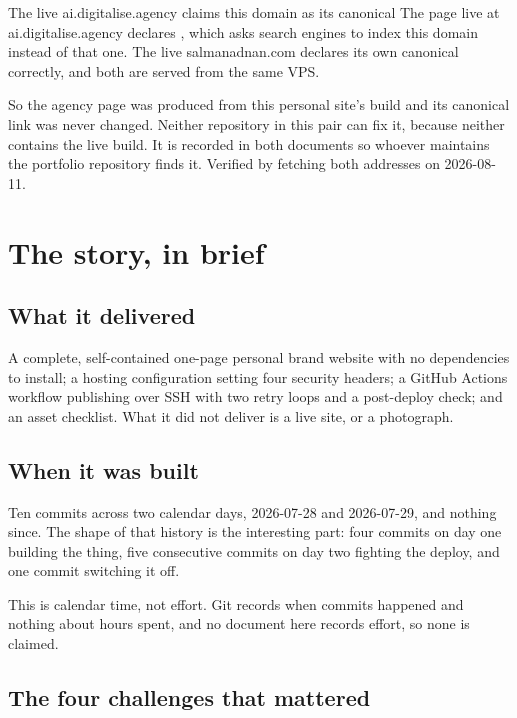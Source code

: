 \documentclass[11pt,a4paper]{article}
\begin{document}
\begin{honest}{The live ai.digitalise.agency claims this domain as its canonical}
The page live at ai.digitalise.agency declares
, which asks search
engines to index this domain instead of that one. The live salmanadnan.com declares
its own canonical correctly, and both are served from the same VPS.

So the agency page was produced from this personal site's build and its canonical
link was never changed. Neither repository in this pair can fix it, because neither
contains the live build. It is recorded in both documents so whoever maintains the
portfolio repository finds it. Verified by fetching both addresses on 2026-08-11.
\end{honest}

\section{The story, in brief}

\subsection{What it delivered}

A complete, self-contained one-page personal brand website with no dependencies to
install; a hosting configuration setting four security headers; a GitHub Actions
workflow publishing over SSH with two retry loops and a post-deploy check; and an
asset checklist. What it did not deliver is a live site, or a photograph.

\subsection{When it was built}

Ten commits across two calendar days, 2026-07-28 and 2026-07-29, and nothing since.
The shape of that history is the interesting part: four commits on day one building
the thing, five consecutive commits on day two fighting the deploy, and one commit
switching it off.

This is calendar time, not effort. Git records when commits happened and nothing
about hours spent, and no document here records effort, so none is claimed.

\subsection{The four challenges that mattered}
\end{document}
